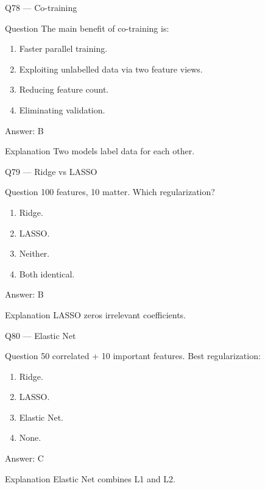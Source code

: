 \documentclass[aspectratio=169,8pt]{beamer}
\begin{document}
	\begin{frame}{Q78 --- Co-training}
		\begin{block}{Question}
			The main benefit of co-training is:
		\end{block}
		\begin{enumerate}
			\item Faster parallel training.
			\item Exploiting unlabelled data via two feature views.
			\item Reducing feature count.
			\item Eliminating validation.
		\end{enumerate}
		\begin{exampleblock}{Answer: B}\end{exampleblock}
		\begin{block}{Explanation}
			Two models label data for each other.
		\end{block}
	\end{frame}
	
	\begin{frame}{Q79 --- Ridge vs LASSO}
		\begin{block}{Question}
			100 features, 10 matter. Which regularization?
		\end{block}
		\begin{enumerate}
			\item Ridge.
			\item LASSO.
			\item Neither.
			\item Both identical.
		\end{enumerate}
		\begin{exampleblock}{Answer: B}\end{exampleblock}
		\begin{block}{Explanation}
			LASSO zeros irrelevant coefficients.
		\end{block}
	\end{frame}
	
	\begin{frame}{Q80 --- Elastic Net}
		\begin{block}{Question}
			50 correlated + 10 important features. Best regularization:
		\end{block}
		\begin{enumerate}
			\item Ridge.
			\item LASSO.
			\item Elastic Net.
			\item None.
		\end{enumerate}
		\begin{exampleblock}{Answer: C}\end{exampleblock}
		\begin{block}{Explanation}
			Elastic Net combines L1 and L2.
		\end{block}
	\end{frame}
	
\end{document}
